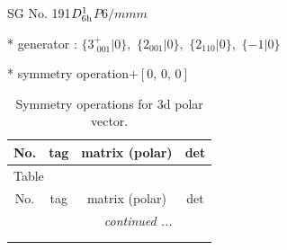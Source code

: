 \documentclass[fleqn,8pt]{jsarticle}
\begin{document}
\setcounter{MaxMatrixCols}{32}

\renewcommand{\tablename}{Table~}
\renewcommand{\figurename}{Figure~}
\begin{center}
\LARGE
SG No. 191\quad$D_{\rm 6h}^{1}$\quad$P6/mmm$\quad[ hexagonal ]
\end{center}

* generator : $\{3^{+}_{\,\,001}|0\},\,\,\{2{}_{001}|0\},\,\,\{2{}_{110}|0\},\,\,\{-1|0\}$

* symmetry operation\quad$+\left[ 0,\, 0,\, 0 \right]$
\renewcommand{\arraystretch}{1.3}
\begin{longtable}{cccc}
\caption{Symmetry operations for 3d polar vector.}
 \\
 \hline \hline
No. & tag & matrix (polar) & det \\ \hline \endfirsthead

\multicolumn{3}{l}{\tablename\ \thetable{}} \\
 \hline \hline
No. & tag & matrix (polar) & det \\ \hline \endhead

 \hline \hline
\multicolumn{3}{r}{\footnotesize\it continued ...} \\ \endfoot

 \hline \hline
\multicolumn{3}{r}{} \\ \endlastfoot


\end{longtable}
\end{document}
